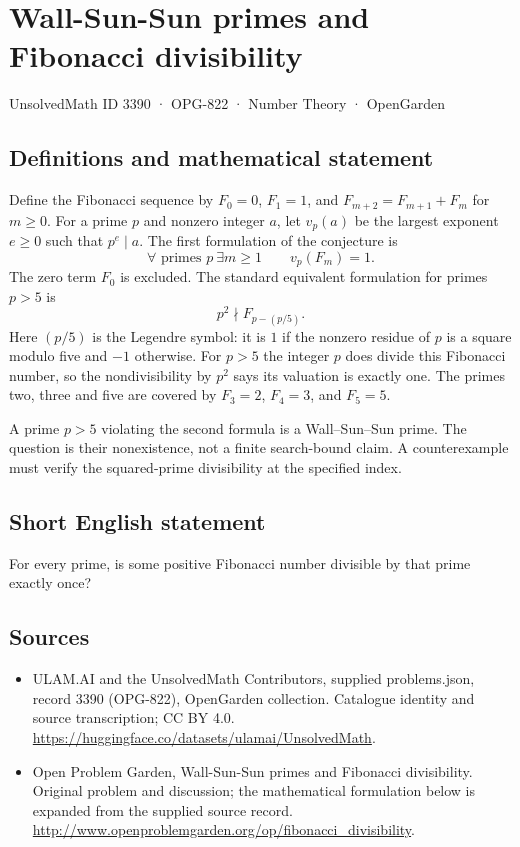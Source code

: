 \documentclass[11pt,a4paper]{article}
\begin{document}
\section*{Wall-Sun-Sun primes and Fibonacci divisibility}\label{3390}
{\small UnsolvedMath ID 3390 · OPG-822 · Number Theory · OpenGarden}
\subsection{Definitions and mathematical statement}
Define the Fibonacci sequence by $F_0=0$, $F_1=1$, and
$F_{m+2}=F_{m+1}+F_m$ for $m\ge0$. For a prime $p$ and nonzero
integer $a$, let $v_p(a)$ be the largest exponent $e\ge0$ such that
$p^e\mid a$. The first formulation of the conjecture is
\[
 \forall\text{ primes }p\ \exists m\ge1\qquad v_p(F_m)=1.
\]
The zero term $F_0$ is excluded. The standard equivalent formulation
for primes $p>5$ is
\[
                  p^2\nmid F_{p-(p/5)}.
\]
Here $(p/5)$ is the Legendre symbol: it is $1$ if the nonzero residue
of $p$ is a square modulo five and $-1$ otherwise. For $p>5$ the
integer $p$ does divide this Fibonacci number, so the nondivisibility
by $p^2$ says its valuation is exactly one. The primes two, three
and five are covered by $F_3=2$, $F_4=3$, and $F_5=5$.

A prime $p>5$ violating the second formula is a Wall--Sun--Sun
prime. The question is their nonexistence, not a finite search-bound
claim. A counterexample must verify the squared-prime divisibility
at the specified index.
\subsection{Short English statement}
For every prime, is some positive Fibonacci number divisible by that prime exactly once?
\subsection{Sources}
\begin{itemize}
\item[S1] ULAM.AI and the UnsolvedMath Contributors, supplied problems.json, record 3390 (OPG-822), OpenGarden collection. Catalogue identity and source transcription; CC BY 4.0.
\url{https://huggingface.co/datasets/ulamai/UnsolvedMath}.
\item[S2] Open Problem Garden, Wall-Sun-Sun primes and Fibonacci divisibility. Original problem and discussion; the mathematical formulation below is expanded from the supplied source record.
\url{http://www.openproblemgarden.org/op/fibonacci_divisibility}.
\end{itemize}
\end{document}
